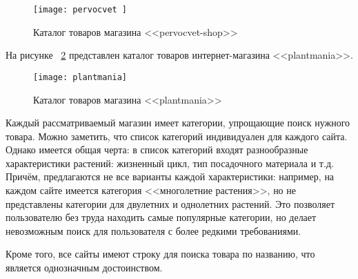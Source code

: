 \begin{figure}[h!]
	\texttt{[image: pervocvet ]}
	\caption{Каталог товаров магазина <<pervocvet-shop>>}
	\label{pervocvet:image}
\end{figure}


На рисунке ~\ref{plantmania:image} представлен каталог товаров интернет-магазина <<plantmania>>.

\begin{figure}[h!]
	\texttt{[image: plantmania]}
	\caption{Каталог товаров магазина <<plantmania>>}
	\label{plantmania:image}
\end{figure}


Каждый рассматриваемый магазин имеет категории, упрощающие поиск нужного товара. Можно заметить, что список категорий индивидуален для каждого сайта. Однако имеется общая черта: в список категорий входят разнообразные характеристики растений: жизненный цикл, тип посадочного материала и т.д. Причём, предлагаются не все варианты каждой характеристики: например, на каждом сайте имеется категория <<многолетние растения>>, но не представлены категории для двулетних и однолетних растений. Это позволяет пользователю без труда находить самые популярные категории,  но делает невозможным поиск для пользователя с более редкими требованиями.

Кроме того, все сайты имеют строку для поиска товара по названию, что является однозначным достоинством.

